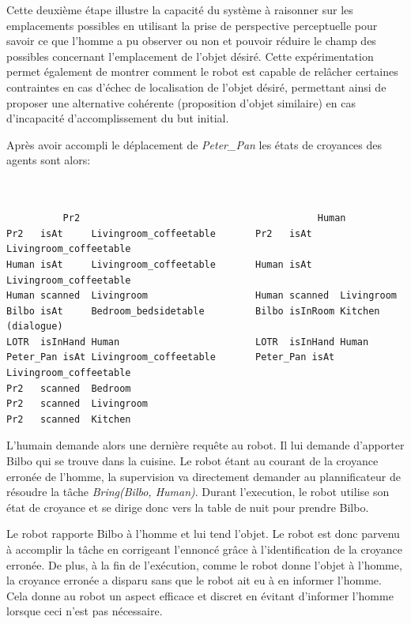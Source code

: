 \documentclass[a4paper,11pt,twoside]{StyleThese}
\begin{document}
Cette deuxième étape illustre la capacité du système à raisonner sur les emplacements possibles en utilisant la prise de perspective perceptuelle pour savoir ce que l'homme a pu observer ou non et pouvoir réduire le champ des possibles concernant l'emplacement de l'objet désiré. Cette expérimentation permet également de montrer comment le robot est capable de relâcher certaines contraintes en cas d'échec de localisation de l'objet désiré, permettant ainsi de proposer une alternative cohérente (proposition d'objet similaire) en cas d'incapacité d'accomplissement du but initial.


Après avoir accompli le déplacement de \textit{Peter\_Pan} les états de croyances des agents sont alors:

\begin{scriptsize}
\begin{verbatim}


          Pr2                                          Human
Pr2   isAt     Livingroom_coffeetable       Pr2   isAt     Livingroom_coffeetable
Human isAt     Livingroom_coffeetable       Human isAt     Livingroom_coffeetable
Human scanned  Livingroom                   Human scanned  Livingroom
Bilbo isAt     Bedroom_bedsidetable         Bilbo isInRoom Kitchen (dialogue)
LOTR  isInHand Human                        LOTR  isInHand Human 
Peter_Pan isAt Livingroom_coffeetable       Peter_Pan isAt Livingroom_coffeetable 
Pr2   scanned  Bedroom
Pr2   scanned  Livingroom
Pr2   scanned  Kitchen

\end{verbatim}
\end{scriptsize}

L'humain demande alors une dernière requête au robot.
Il lui demande d'apporter Bilbo qui se trouve dans la cuisine.
Le robot étant au courant de la croyance erronée de l'homme, la supervision va directement demander au plannificateur de résoudre la tâche \textit{Bring(Bilbo, Human)}. Durant l'execution, le robot utilise son état de croyance et se dirige donc vers la table de nuit pour prendre Bilbo.

Le robot rapporte Bilbo à l'homme et lui tend l'objet.
Le robot est donc parvenu à accomplir la tâche en corrigeant l'ennoncé grâce à l'identification de la croyance erronée. De plus, à la fin de l'exécution, comme le robot donne l'objet à l'homme, la croyance erronée a disparu sans que le robot ait eu à en informer l'homme.
Cela donne au robot un aspect efficace et discret en évitant d'informer l'homme lorsque ceci n'est pas nécessaire.
\end{document}
